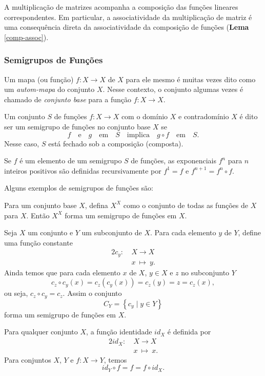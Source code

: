 A multiplicação de matrizes acompanha a composição das funções lineares correspondentes. Em particular, a associatividade da multiplicação de matriz é uma consequência direta da associatividade da composição de funções (\textbf{Lema} \ref{comp-assoc}).

\subsubsection{Semigrupos de Funções}
Um mapa (ou função) $f: X \to X$ de $X$ para ele mesmo é muitas vezes dito como um \emph{autom-mapa} do conjunto $X$. Nesse contexto, o conjunto algumas vezes é chamado de \emph{conjunto base} para a função $f: X \to X$.
\begin{definition}
  Um conjunto $S$ de funções $f: X \to X$ com o domínio $X$ e contradomínio $X$ é dito ser um semigrupo de funções no conjunto base $X$ se $$f\quad \textrm{e}\quad g\quad \textrm{em}\quad S\quad \textrm{implica}\quad g \circ f\quad \textrm{em}\quad S. $$
Nesse caso, $S$ está fechado sob a composição (composta).

Se $f$ é um elemento de um semigrupo $S$ de funções, as exponenciais $f^n$ para $n$ inteiros positivos são definidas recursivamente por $f^{1} = f$ e $f^{n+1} = f^n \circ f.$

Alguns exemplos de semigrupos de funções são:
\begin{exmp}
  Para um conjunto base $X$, defina $X^X$ como o conjunto de todas as funções de $X$ para $X$. Então $X^X$ forma um semigrupo de funções em $X$.
\end{exmp}
\end{definition}
\begin{exmp}
  Seja $X$ um conjunto e $Y$ um subconjunto de $X$. Para cada elemento $y$ de $Y$, define uma função constante
  \begin{alignat}{2}
    c_{y}:\ &X \to X \nonumber\\
    &x\ \mapsto\ y.
    \nonumber
  \end{alignat}
  Ainda temos que para cada elemento $x$ de $X$, $y \in X$ e $z$ no subconjunto $Y$
  $$c_{z} \circ c_{y}(x) = c_{z}\left(c_{y}(x)\right) = c_{z}(y) = z = c_{z}(x),$$
  ou seja, $c_{z} \circ c_{y} = c_{z}$. Assim o conjunto $$C_{Y} = \left\{c_{y}\mid y \in Y\right\}$$ forma um semigrupo de funções em $X$.
\end{exmp}
\begin{definition}
  Para qualquer conjunto $X$, a função identidade $id_{X}$ é definida por
  \begin{alignat}{2}
    id_{X}:\ &X \to X \nonumber\\
    &x\ \mapsto\ x.
    \nonumber
  \end{alignat}
  Para conjuntos $X$, $Y$ e $f: X \to Y$, temos
  $$id_{Y}\circ f = f = f \circ id_{X}.$$
\end{definition}
